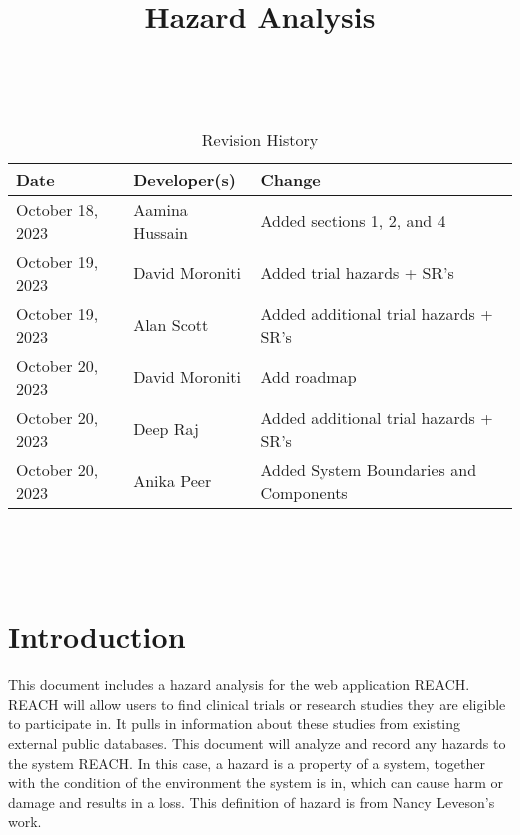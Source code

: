 \documentclass{article}
\title{Hazard Analysis\\\progname}
\author{\authname}
\date{}
\begin{document}
\maketitle
\thispagestyle{empty}

~\newpage


\begin{table}[hp]
  \caption{Revision History} \label{TblRevisionHistory}
  \begin{tabularx}{\textwidth}{llX}
    \toprule
    \textbf{Date}    & \textbf{Developer(s)} & \textbf{Change}                        \\
    \midrule
    October 18, 2023 & Aamina Hussain        & Added sections 1, 2, and 4             \\
    October 19, 2023 & David Moroniti        & Added trial hazards + SR's             \\
    October 19, 2023 & Alan Scott            & Added additional trial hazards + SR's  \\
    October 20, 2023 & David Moroniti        & Add roadmap                            \\
    October 20, 2023 & Deep Raj              & Added additional trial hazards + SR's  \\
    October 20, 2023 & Anika Peer            & Added System Boundaries and Components \\
    \bottomrule
  \end{tabularx}
\end{table}

~\newpage

\tableofcontents

~\newpage


\section{Introduction}
This document includes a hazard analysis for the web application REACH. REACH will allow users
to find clinical trials or research studies they are eligible to participate in. It pulls in information about these studies
from existing external public databases. This document will analyze and record any hazards to the system REACH. In this case,
a hazard is a property of a system, together with the condition of the environment the system is in, which can cause harm or
damage and results in a loss. This definition of hazard is from Nancy Leveson's work.
\end{document}
